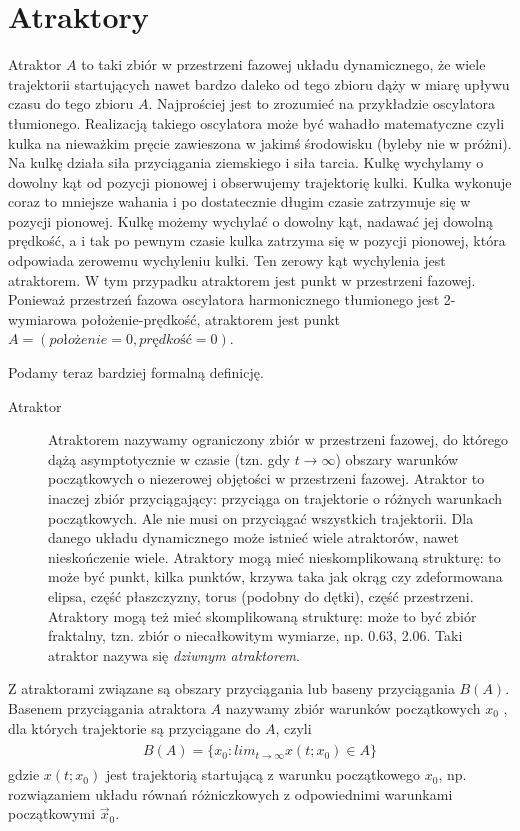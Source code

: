 \documentclass[a4paper,12pt,polish]{sphinxmanual}
\begin{document}
\section{Atraktory}
\label{ch1/chI024:atraktory}\label{ch1/chI024::doc}
Atraktor $A$ to taki zbiór w przestrzeni fazowej układu dynamicznego, że wiele trajektorii startujących nawet bardzo daleko od tego zbioru  dąży w miarę upływu czasu do tego zbioru $A$.  Najprościej jest to zrozumieć na przykładzie oscylatora tłumionego. Realizacją takiego oscylatora może być wahadło matematyczne czyli kulka  na nieważkim pręcie zawieszona w jakimś środowisku (byleby nie w próżni). Na kulkę działa siła przyciągania ziemskiego i siła tarcia. Kulkę wychylamy o dowolny kąt od pozycji pionowej  i obserwujemy trajektorię  kulki. Kulka wykonuje coraz to mniejsze wahania i po dostatecznie długim czasie zatrzymuje się w pozycji pionowej. Kulkę możemy wychylać o dowolny kąt, nadawać jej dowolną prędkość, a i tak po pewnym czasie kulka zatrzyma  się w pozycji pionowej, która odpowiada zerowemu wychyleniu kulki. Ten zerowy kąt wychylenia jest atraktorem. W tym przypadku atraktorem jest  punkt w przestrzeni fazowej. Ponieważ przestrzeń fazowa oscylatora harmonicznego  tłumionego jest 2-wymiarowa położenie-prędkość, atraktorem jest punkt $A = (położenie = 0, prędkość = 0)$.

Podamy teraz bardziej formalną definicję.
\begin{description}
\item[{Atraktor}] \leavevmode
Atraktorem nazywamy ograniczony zbiór w przestrzeni fazowej, do którego dążą asymptotycznie w czasie (tzn. gdy $t \to \infty$) obszary warunków początkowych o niezerowej objętości  w przestrzeni fazowej. Atraktor to inaczej zbiór przyciągający: przyciąga on trajektorie o różnych warunkach początkowych.  Ale nie musi on przyciągać wszystkich trajektorii. Dla danego układu dynamicznego może istnieć wiele atraktorów, nawet nieskończenie wiele. Atraktory mogą mieć  nieskomplikowaną strukturę: to może być  punkt, kilka punktów, krzywa taka jak okrąg czy zdeformowana elipsa, część płaszczyzny, torus (podobny do dętki),  część przestrzeni. Atraktory mogą też  mieć skomplikowaną strukturę: może to być zbiór fraktalny, tzn. zbiór o niecałkowitym wymiarze, np. 0.63, 2.06. Taki atraktor nazywa się \emph{dziwnym atraktorem}.

\end{description}

Z atraktorami związane są obszary przyciągania lub baseny przyciągania $B(A)$. Basenem przyciągania atraktora $A$ nazywamy zbiór warunków początkowych $x_0$ , dla których trajektorie są przyciągane do $A$, czyli
\label{ch1/chI024:equation-eqn1}\begin{gather}
\begin{split}B(A) = \{ x_0: lim_{t \to \infty} x(t; x_0) \in A\}\end{split}\label{ch1/chI024-eqn1}
\end{gather}
gdzie $x(t; x_0)$ jest trajektorią startującą z warunku początkowego $x_0$, np. rozwiązaniem układu równań różniczkowych  z odpowiednimi warunkami początkowymi $\vec x_0$.
\end{document}
